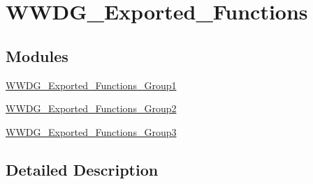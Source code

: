 \hypertarget{group___w_w_d_g___exported___functions}{}\section{W\+W\+D\+G\+\_\+\+Exported\+\_\+\+Functions}
\label{group___w_w_d_g___exported___functions}
\subsection*{Modules}
\begin{DoxyCompactItemize}
\item 
\hyperlink{group___w_w_d_g___exported___functions___group1}{W\+W\+D\+G\+\_\+\+Exported\+\_\+\+Functions\+\_\+\+Group1}
\item 
\hyperlink{group___w_w_d_g___exported___functions___group2}{W\+W\+D\+G\+\_\+\+Exported\+\_\+\+Functions\+\_\+\+Group2}
\item 
\hyperlink{group___w_w_d_g___exported___functions___group3}{W\+W\+D\+G\+\_\+\+Exported\+\_\+\+Functions\+\_\+\+Group3}
\end{DoxyCompactItemize}


\subsection{Detailed Description}

